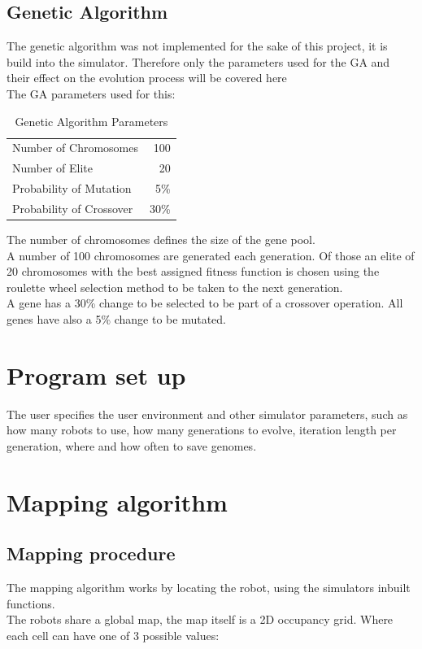 \subsection{Genetic Algorithm}
The genetic algorithm was not implemented for the sake of this project, it is build into the simulator. Therefore only the parameters used for the GA and their effect on the evolution process will be covered here \\
The GA parameters used for this:\\

\begin{table}[h]
\begin{center}
\begin{tabular}{l r}
Number of Chromosomes & 100 \\
Number of Elite & 20\\
Probability of Mutation & 5\%\\
Probability of Crossover & 30\%\\
\end{tabular}
\caption{Genetic Algorithm Parameters}
\end{center}
\end{table}

The number of chromosomes defines the size of the gene pool. \\
A number of 100 chromosomes are generated each generation. Of those an elite of 20 chromosomes with the best assigned fitness function is chosen using the roulette wheel selection method to be taken to the next generation.\\
A gene has a 30\% change to be selected to be part of a crossover operation.
All genes have also a 5\% change to be mutated. 

\section{Program set up}
The user specifies the user environment and other simulator parameters, such as how many robots to use, how many generations to evolve, iteration length per generation, where and how often to save genomes. \\

\section{Mapping algorithm}
\subsection{Mapping procedure}
The mapping algorithm works by locating the robot, using the simulators inbuilt functions. \\
The robots share a global map, the map itself is a 2D occupancy grid. Where each cell can have one of 3 possible values:\\

